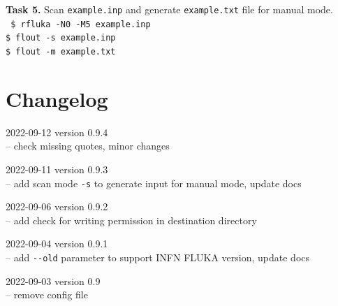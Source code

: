 \documentclass{article}
\begin{document}
\textbf{Task 5.} Scan \texttt{example.inp} and generate \texttt{example.txt} file for manual mode.\\
\texttt{
\$ rfluka -N0 -M5 example.inp\\
\$ flout -s example.inp\\
\$ flout -m example.txt\\
}

\section*{Changelog}
\raggedright
2022-09-12 version 0.9.4\\
-- check missing quotes, minor changes\newline

2022-09-11 version 0.9.3\\
-- add scan mode \texttt{-s} to generate input for manual mode, update docs\newline

2022-09-06 version 0.9.2\\
-- add check for writing permission in destination directory\newline

2022-09-04 version 0.9.1\\
-- add \texttt{-{}-old} parameter to support INFN FLUKA version, update docs\newline

2022-09-03 version 0.9\\
-- remove config file\newline
\end{document}
